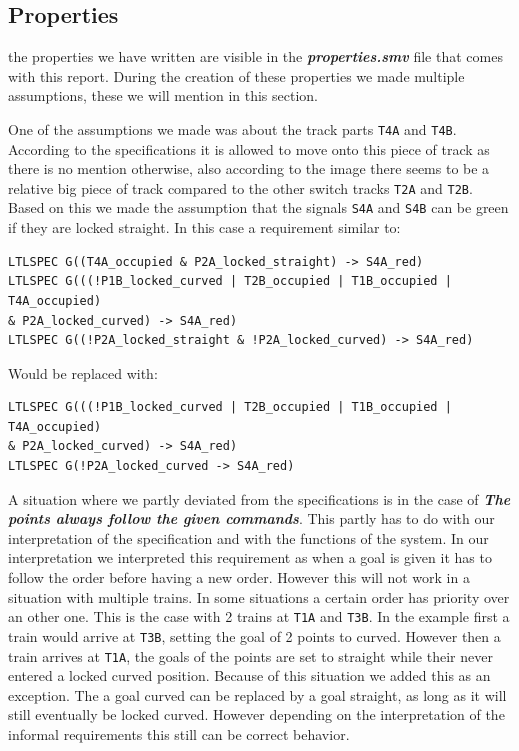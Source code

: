 \documentclass[a4paper]{article}
\begin{document}
	\subsection{Properties}
	the properties we have written are visible in the \textit{\textbf{properties.smv}} file that comes with this report.
	During the creation of these properties we made multiple assumptions, these we will mention in this section.
	
	One of the assumptions we made was about the track parts \texttt{T4A} and \texttt{T4B}. According to the specifications it is allowed to move onto this piece of track as there is no mention otherwise, also according to the image there seems to be a relative big piece of track compared to the other switch tracks \texttt{T2A} and \texttt{T2B}. Based on this we made the assumption that the signals \texttt{S4A} and \texttt{S4B} can be green if they are locked straight. In this case a requirement similar to:
	\begin{lstlisting}
LTLSPEC G((T4A_occupied & P2A_locked_straight) -> S4A_red)
LTLSPEC G(((!P1B_locked_curved | T2B_occupied | T1B_occupied | T4A_occupied) 
& P2A_locked_curved) -> S4A_red)
LTLSPEC G((!P2A_locked_straight & !P2A_locked_curved) -> S4A_red)
	\end{lstlisting}
	Would be replaced with:
	\begin{lstlisting}
LTLSPEC G(((!P1B_locked_curved | T2B_occupied | T1B_occupied | T4A_occupied) 
& P2A_locked_curved) -> S4A_red)
LTLSPEC G(!P2A_locked_curved -> S4A_red)
	\end{lstlisting}
	
	A situation where we partly deviated from the specifications is in the case of \textit{\textbf{The points always follow the given commands}}. This partly has to do with our interpretation of the specification and with the functions of the system. In our interpretation we interpreted this requirement as when a goal is given it has to follow the order before having a new order. However this will not work in a situation with multiple trains. In some situations a certain order has priority over an other one. This is the case with 2 trains at \texttt{T1A} and \texttt{T3B}. In the example first a train would arrive at \texttt{T3B}, setting the goal of 2 points to curved. However then a train arrives at \texttt{T1A}, the goals of the points are set to straight while their never entered a locked curved position.
	Because of this situation we added this as an exception. The a goal curved can be replaced by a goal straight, as long as it will still eventually be locked curved. However depending on the interpretation of the informal requirements this still can be correct behavior.
	
\end{document}
